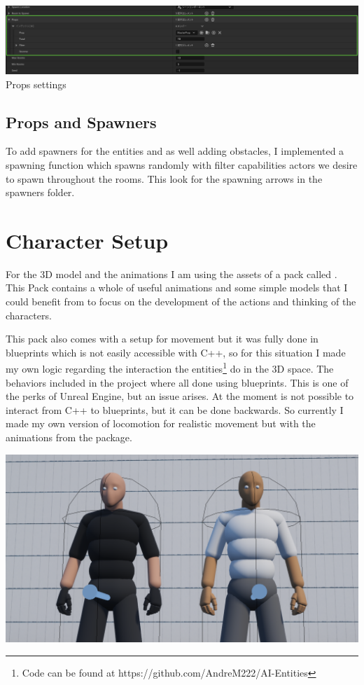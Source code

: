 \documentclass[10pt, letterpaper]{article}
\begin{document}
\begin{Form}
\begin{center}
		\vspace{0.4cm}
		\includegraphics[scale=0.3]{IMG/PropsPreview.png} \\
		Props settings

	\end{center}

	\subsection{Props and Spawners}

	To add spawners for the entities and as well adding obstacles, I implemented a spawning function which spawns randomly
	with filter capabilities actors we desire to spawn throughout the rooms. This look for the spawning arrows in the spawners
	folder.

	\section{Character Setup}

	For the 3D model and the animations I am using the assets of a pack called  \parencite{AdvanceLocomotionSystemV4}. This
	Pack contains a whole of useful animations and some simple models that I could benefit from to focus on the development
	of the actions and thinking of the characters.

	This pack also comes with a setup for movement but it was fully done in blueprints which is not easily accessible
	with C++, so for this situation I made my own logic regarding the interaction the entities\footnote{Code can be found at https://github.com/AndreM222/AI-Entities} do in the 3D space.
	The behaviors included in the project where all done using blueprints. This is one of the perks of Unreal Engine,
	but an issue arises. At the moment is not possible to interact from C++ to blueprints, but it can be done backwards.
	So currently I made my own version of locomotion for realistic movement but with the animations from the package.

	\begin{center}
		\includegraphics[scale=0.6]{IMG/Teams-Picture-Preview.png} \\


\end{center}
\end{Form}
\end{document}
